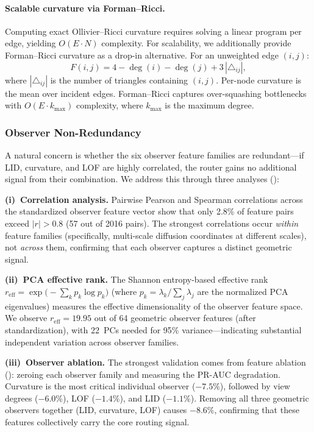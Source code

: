 \documentclass[11pt,a4paper]{article}
\begin{document}
\paragraph{Scalable curvature via Forman--Ricci.}
Computing exact Ollivier--Ricci curvature requires solving a linear
program per edge, yielding $O(E \cdot N)$ complexity.
For scalability, we additionally provide Forman--Ricci curvature
\citep{forman2003bochner} as a drop-in alternative.
For an unweighted edge $(i, j)$:
\begin{equation}
  \label{eq:forman}
  F(i, j) = 4 - \deg(i) - \deg(j)
    + 3\,|\triangle_{ij}|,
\end{equation}
where $|\triangle_{ij}|$ is the number of triangles containing $(i, j)$.
Per-node curvature is the mean over incident edges.
Forman--Ricci captures over-squashing bottlenecks
\citep{topping2022understanding} with $O(E \cdot k_{\max})$ complexity,
where $k_{\max}$ is the maximum degree.

\subsubsection{Observer Non-Redundancy}
\label{sec:observer_nonredundancy}

A natural concern is whether the six observer feature families are
redundant---if LID, curvature, and LOF are highly correlated, the
router gains no additional signal from their combination.
We address this through three analyses ():

\textbf{(i)~Correlation analysis.}
Pairwise Pearson and Spearman correlations across the standardized
observer feature vector show that only 2.8\% of feature pairs exceed
$|r| > 0.8$ (57 out of 2016 pairs).
The strongest correlations occur \emph{within} feature families
(specifically, multi-scale diffusion coordinates at different scales),
not \emph{across} them, confirming that each observer captures a
distinct geometric signal.

\textbf{(ii)~PCA effective rank.}
The Shannon entropy-based effective rank
$r_{\text{eff}} = \exp\!\big({-}\sum_k p_k \log p_k\big)$
(where $p_k = \lambda_k / \sum_j \lambda_j$ are the normalized PCA
eigenvalues) measures the effective dimensionality of the observer
feature space.
We observe $r_{\text{eff}} = 19.95$ out of 64 geometric observer
features (after standardization), with 22~PCs needed for 95\%
variance---indicating substantial independent variation across
observer families.

\textbf{(iii)~Observer ablation.}
The strongest validation comes from feature ablation
(): zeroing each observer family and
measuring the PR-AUC degradation.
Curvature is the most critical individual observer ($-7.5\%$),
followed by view degrees ($-6.0\%$), LOF ($-1.4\%$), and LID
($-1.1\%$).
Removing all three geometric observers together (LID, curvature, LOF)
causes $-8.6\%$, confirming that these features collectively carry
the core routing signal.
\end{document}
